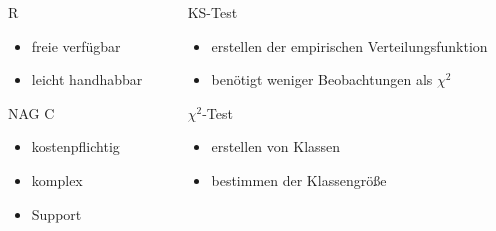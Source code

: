 \documentclass{beamer}
\begin{document}
\begin{frame}{\insertsection}

\begin{columns}
\begin{column}{.48\textwidth}
\begin{block}{R}
	\begin{itemize}
		\item freie verfügbar
		\item leicht handhabbar
	\end{itemize}
\end{block}
\vspace{1cm}

\begin{block}{NAG C}
	\begin{itemize}
		\item kostenpflichtig
		\item komplex
		\item Support
	\end{itemize}
\end{block}
\end{column}

\hfill
\begin{column}{.48\textwidth}
\begin{block}{KS-Test}
	\begin{itemize}
		\item erstellen der empirischen Verteilungsfunktion
		\item benötigt weniger Beobachtungen als $\chi^2$
	\end{itemize}
\end{block}
\begin{block}{$\chi^2$-Test}
	\begin{itemize}		
		\item erstellen von Klassen
		\item bestimmen der Klassengröße
	\end{itemize}
\end{block}
\end{column}
\end{columns}




\end{frame}
\end{document}
